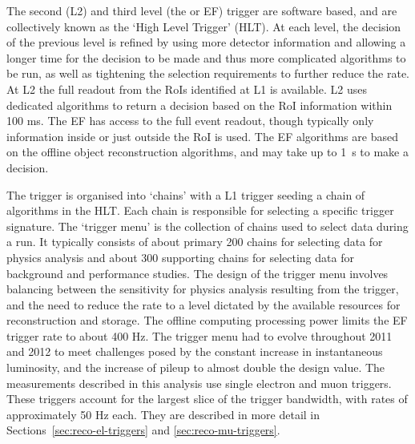 The second (L2) and third level (the  or EF) trigger are software based, and are collectively known as the
`High Level Trigger' (HLT). At each level, the decision of the previous level is
refined by using more detector information and allowing a longer time for the
decision to be made and thus more complicated algorithms to be run, as well as
tightening the selection requirements to further reduce the rate. At L2 the full
readout from the RoIs identified at L1 is available. L2 uses dedicated
algorithms to return a decision based on the RoI information within 100 ms. The
EF has access to the full event readout, though typically only information
inside or just outside the RoI is used. The EF algorithms are based on the
offline object reconstruction algorithms, and may take up to 1~s to make
a decision.

The trigger is organised into `chains' with a L1 trigger seeding a chain of
algorithms in the HLT. Each chain is responsible for selecting a specific
trigger signature. The `trigger menu' is the collection of chains used to select
data during a run. It typically consists of about primary 200 chains for selecting data
for physics analysis and about 300 supporting chains for selecting data for
background and performance studies. The design of the trigger menu involves
balancing between the sensitivity for physics analysis resulting from the
trigger, and the need to reduce the rate to a level dictated by the available
resources for reconstruction and storage. The offline computing processing power
limits the EF trigger rate to about 400 Hz. The trigger menu had to evolve
throughout 2011 and 2012 to meet challenges posed by the constant increase in
instantaneous luminosity, and the increase of pileup to almost double the design
value. The measurements described in this analysis use single electron and muon
triggers. These triggers account for the largest slice of the trigger bandwidth,
with rates of approximately 50 Hz each. They are described in more detail
in Sections~\ref{sec:reco-el-triggers} and \ref{sec:reco-mu-triggers}.

